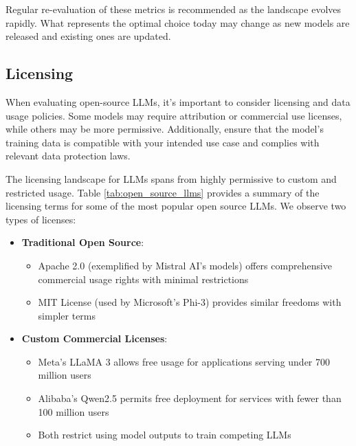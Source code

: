 Regular re-evaluation of these metrics is recommended as the landscape evolves rapidly. What represents the optimal choice today may change as new models are released and existing ones are updated.

\subsection{Licensing}

When evaluating open-source LLMs, it's important to consider licensing and data usage policies. Some models may require attribution or commercial use licenses, while others may be more permissive. Additionally, ensure that the model's training data is compatible with your intended use case and complies with relevant data protection laws.

The licensing landscape for LLMs spans from highly permissive to custom and restricted usage. Table \ref{tab:open_source_llms} provides a summary of the licensing terms for some of the most popular open source LLMs. We observe two types of licenses:
\begin{itemize}
    \item \textbf{Traditional Open Source}:
    \begin{itemize}
        \item Apache 2.0 (exemplified by Mistral AI's models) offers comprehensive commercial usage rights with minimal restrictions
        \item MIT License (used by Microsoft's Phi-3) provides similar freedoms with simpler terms
    \end{itemize}
    \item \textbf{Custom Commercial Licenses}:
    \begin{itemize}
        \item Meta's LLaMA 3 allows free usage for applications serving under 700 million users
        \item Alibaba's Qwen2.5 permits free deployment for services with fewer than 100 million users
        \item Both restrict using model outputs to train competing LLMs
    \end{itemize}
\end{itemize}
